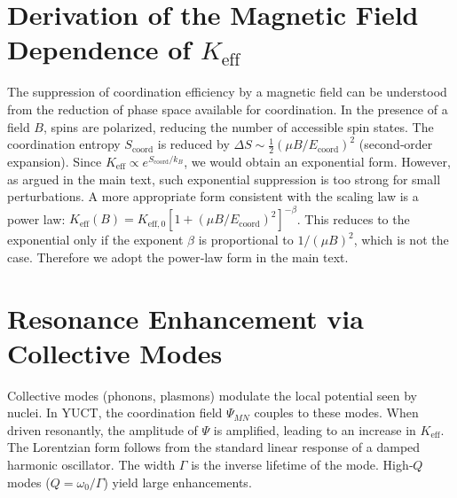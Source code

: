 \documentclass[12pt]{article}
\theoremstyle{remark}
\newcommand{\Keff}{K_{\mathrm{eff}}}
\newcommand{\Keffzero}{K_{\mathrm{eff},0}}
\begin{document}
	\appendix
	
	\section{Derivation of the Magnetic Field Dependence of \(\Keff\)}
	\label{app:B}
	
	The suppression of coordination efficiency by a magnetic field can be understood from the reduction of phase space available for coordination. In the presence of a field \(B\), spins are polarized, reducing the number of accessible spin states. The coordination entropy \(S_{\text{coord}}\) is reduced by \(\Delta S \sim \frac{1}{2} (\mu B / E_{\mathrm{coord}})^2\) (second‑order expansion). Since \(\Keff \propto e^{S_{\text{coord}}/k_B}\), we would obtain an exponential form. However, as argued in the main text, such exponential suppression is too strong for small perturbations. A more appropriate form consistent with the scaling law is a power law: \(\Keff(B) = \Keffzero [1 + (\mu B/E_{\mathrm{coord}})^2]^{-\beta}\). This reduces to the exponential only if the exponent \(\beta\) is proportional to \(1/(\mu B)^2\), which is not the case. Therefore we adopt the power‑law form in the main text.
	
	\section{Resonance Enhancement via Collective Modes}
	\label{app:resonance}
	
	Collective modes (phonons, plasmons) modulate the local potential seen by nuclei. In YUCT, the coordination field \(\Psi_{MN}\) couples to these modes. When driven resonantly, the amplitude of \(\Psi\) is amplified, leading to an increase in \(\Keff\). The Lorentzian form follows from the standard linear response of a damped harmonic oscillator. The width \(\Gamma\) is the inverse lifetime of the mode. High‑\(Q\) modes (\(Q = \omega_0/\Gamma\)) yield large enhancements.
	
\end{document}
